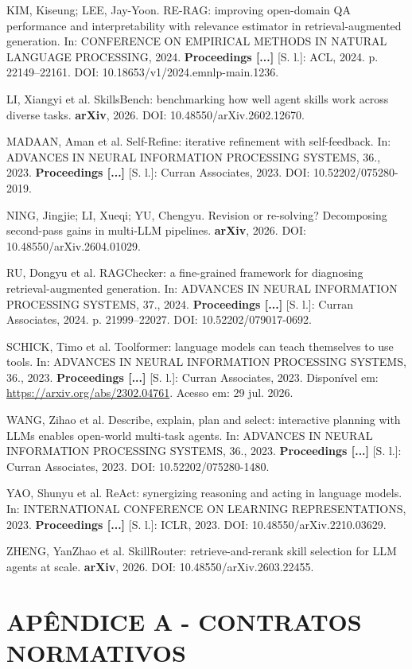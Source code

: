 \documentclass[12pt,a4paper]{article}
\begin{document}
KIM, Kiseung; LEE, Jay-Yoon. RE-RAG: improving open-domain QA performance and interpretability with relevance estimator in retrieval-augmented generation. In: CONFERENCE ON EMPIRICAL METHODS IN NATURAL LANGUAGE PROCESSING, 2024. \textbf{Proceedings [...]} [S. l.]: ACL, 2024. p. 22149--22161. DOI: 10.18653/v1/2024.emnlp-main.1236.

LI, Xiangyi et al. SkillsBench: benchmarking how well agent skills work across diverse tasks. \textbf{arXiv}, 2026. DOI: 10.48550/arXiv.2602.12670.

MADAAN, Aman et al. Self-Refine: iterative refinement with self-feedback. In: ADVANCES IN NEURAL INFORMATION PROCESSING SYSTEMS, 36., 2023. \textbf{Proceedings [...]} [S. l.]: Curran Associates, 2023. DOI: 10.52202/075280-2019.

NING, Jingjie; LI, Xueqi; YU, Chengyu. Revision or re-solving? Decomposing second-pass gains in multi-LLM pipelines. \textbf{arXiv}, 2026. DOI: 10.48550/arXiv.2604.01029.

RU, Dongyu et al. RAGChecker: a fine-grained framework for diagnosing retrieval-augmented generation. In: ADVANCES IN NEURAL INFORMATION PROCESSING SYSTEMS, 37., 2024. \textbf{Proceedings [...]} [S. l.]: Curran Associates, 2024. p. 21999--22027. DOI: 10.52202/079017-0692.

SCHICK, Timo et al. Toolformer: language models can teach themselves to use tools. In: ADVANCES IN NEURAL INFORMATION PROCESSING SYSTEMS, 36., 2023. \textbf{Proceedings [...]} [S. l.]: Curran Associates, 2023. Disponível em: \url{https://arxiv.org/abs/2302.04761}. Acesso em: 29 jul. 2026.

WANG, Zihao et al. Describe, explain, plan and select: interactive planning with LLMs enables open-world multi-task agents. In: ADVANCES IN NEURAL INFORMATION PROCESSING SYSTEMS, 36., 2023. \textbf{Proceedings [...]} [S. l.]: Curran Associates, 2023. DOI: 10.52202/075280-1480.

YAO, Shunyu et al. ReAct: synergizing reasoning and acting in language models. In: INTERNATIONAL CONFERENCE ON LEARNING REPRESENTATIONS, 2023. \textbf{Proceedings [...]} [S. l.]: ICLR, 2023. DOI: 10.48550/arXiv.2210.03629.

ZHENG, YanZhao et al. SkillRouter: retrieve-and-rerank skill selection for LLM agents at scale. \textbf{arXiv}, 2026. DOI: 10.48550/arXiv.2603.22455.



\section*{APÊNDICE A - CONTRATOS NORMATIVOS}
\end{document}
